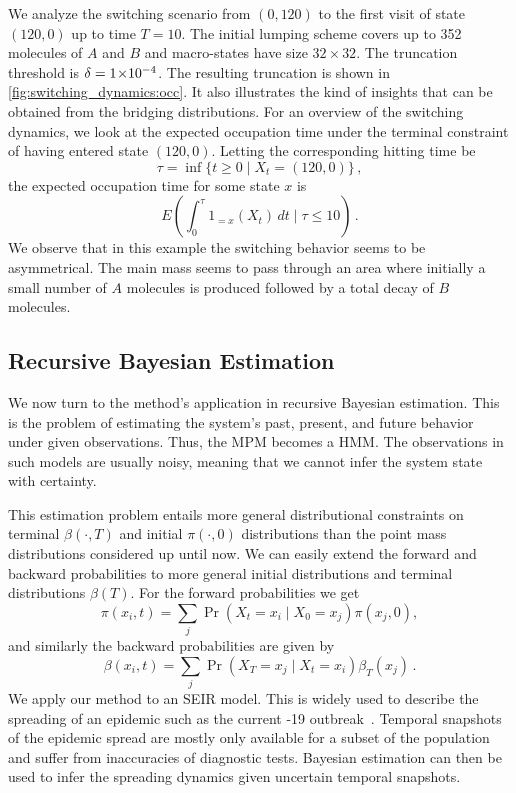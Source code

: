 We analyze the switching scenario from $(0, 120)$ to the first visit of state $(120, 0)$ up to time $T=10$. The initial lumping scheme covers up to \num{352} molecules of $A$ and $B$ and  macro-states have size $32\times32$.
The truncation threshold is $\delta= 1\!\times\hspace{-.5ex} 10^{-4} $.
The resulting truncation is shown in \autoref{fig:switching_dynamics:occ}.
It also illustrates the kind of insights that can be obtained from the bridging distributions.
For an overview of the switching dynamics, we look at the expected occupation time under the terminal constraint of having entered state $(120,0)$. Letting the corresponding hitting time be 
\[
	\tau=\inf\{t\geq 0\mid X_t=(120, 0)\}\,,
\]
the expected occupation time for some state $x$ is
\[
	E\left(\int_0^{\tau}1_{=x}(X_t)\,dt\mid \tau\leq 10\right)\,.
\]
We observe that in this example the switching  behavior seems to be asymmetrical.
The main mass seems to pass through an area where initially a small number of $A$ molecules is produced followed by a total decay of $B$ molecules.


\subsection{Recursive Bayesian Estimation}
We now turn to the method's application in recursive Bayesian estimation.
This is the problem of estimating the system's
past, present, and future behavior under given observations.
Thus, the \ac{MPM} becomes a \acf{HMM}.
The observations in such models are usually noisy, meaning that we cannot infer the system state with certainty.

This estimation problem entails more general distributional constraints on terminal $\beta(\cdot,T)$ and initial $\pi(\cdot, 0)$ distributions than the point mass distributions considered up until now.
We can easily extend the forward and backward probabilities to more general initial
distributions   and terminal distributions $\beta(T)$.
For the forward probabilities we get
\begin{equation}
    \pi(x_i, t) = \sum_j \Pr(X_t=x_i\mid X_0=x_j) \pi(x_j,0),
\end{equation}
and similarly the backward probabilities are given by
\begin{equation}
    \beta(x_i, t) = \sum_j\Pr(X_T=x_j\mid X_t = x_i) \beta_T(x_j)\,.
\end{equation}
We apply our method to an \acf{SEIR} model.
This is widely used to describe the spreading of an epidemic such as the current 
-19 outbreak~\parencite{he2020seir,grossmann2020importance}.
Temporal snapshots of the epidemic spread  are mostly only available for a subset of the population and suffer from   inaccuracies of diagnostic tests.
Bayesian estimation can then be used to infer the spreading dynamics given uncertain temporal snapshots.

